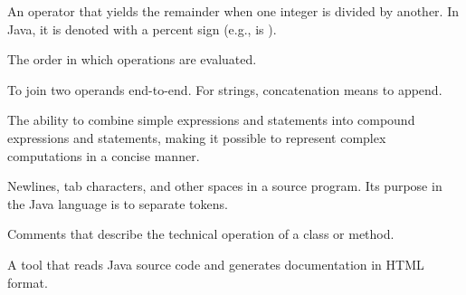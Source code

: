 \begin{description}
An operator that yields the remainder when one integer is divided by another.
In Java, it is denoted with a percent sign (e.g.,  is ).

The order in which operations are evaluated.

To join two operands end-to-end.
For strings, concatenation means to append.

The ability to combine simple expressions and statements into compound expressions and statements, making it possible to represent complex computations in a concise manner.

Newlines, tab characters, and other spaces in a source program.
Its purpose in the Java language is to separate tokens.

Comments that describe the technical operation of a class or method.

A tool that reads Java source code and generates documentation in HTML format.

\end{description}
